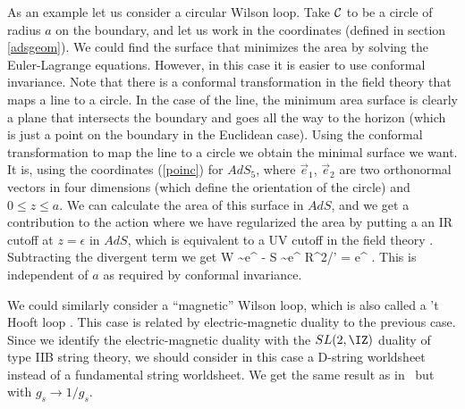 As an example let us consider a circular Wilson loop. Take ${\cal C}$
to be a circle of radius $a$ on the boundary, and let us work in the
\Poincare coordinates (defined in section \ref{adsgeom}).  We could find the
surface that minimizes the area by solving the Euler-Lagrange
equations. However, in this case it is easier to use conformal
invariance. Note that there is a conformal transformation in the field
theory that maps a line to a circle. In the case of the line, the
minimum area surface is clearly a plane that intersects the boundary
and goes all the way to the horizon (which is just a point on the
boundary in the Euclidean case). Using the conformal transformation to
map the line to a circle we obtain the minimal surface we want. It is,
using the coordinates (\ref{poinc}) for $AdS_5$,
where $\vec e_1$, $\vec e_2$ are two orthonormal vectors in four
dimensions (which define the orientation of the circle) and $ 0 \leq z
\leq a $.  We can calculate the area of this surface in $AdS$, and we
get a contribution to the action
where we have regularized the area by putting a an IR cutoff at 
$z=\epsilon$ in 
$AdS$, which is equivalent to a UV  cutoff in the field theory
\cite{Susskind:1998dq}.
Subtracting the divergent term we get
 {
\langle W \rangle 
\sim e^{ - S} \sim e^{ R^2/\alpha'} = e^{  }.
}
This is independent of $a$ as required by conformal invariance. 

We could similarly consider a ``magnetic'' Wilson loop, which is also
called a 't Hooft loop \cite{'tHooft:1979uj}. This case is related by
electric-magnetic duality to the previous case. Since we identify the
electric-magnetic duality with the $SL(2,\IZ)$ duality of type IIB
string theory, we should consider in this case a D-string worldsheet
instead of a fundamental string worldsheet. We get the same result as
in \reswil\ but with $ g_s \to 1/g_s$.


